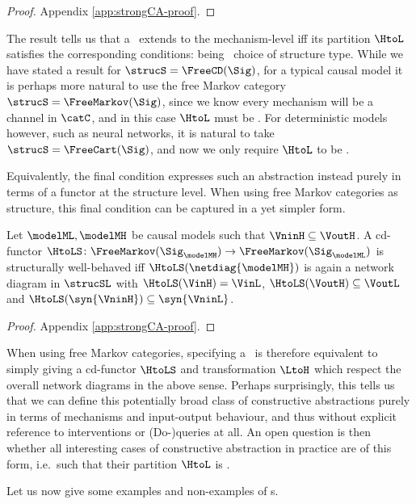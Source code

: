 \documentclass{article}
\begin{document}
\begin{proof}
Appendix \ref{app:strongCA-proof}.
\end{proof}

The result tells us that a \CCA~extends to the mechanism-level iff its partition $\HtoL$ satisfies the corresponding conditions: being \ choice of structure type. While we have stated a result for $\strucS = \FreeCD(\Sig)$, for a typical causal model it is perhaps more natural to use the free Markov category $\strucS = \FreeMarkov(\Sig)$, since we know every mechanism will be a channel in $\catC$, and in this case $\HtoL$ must be \extrastrong. For deterministic models however, such as neural networks, it is natural to take $\strucS = \FreeCart(\Sig)$, and now we only require $\HtoL$ to be \strong. 

Equivalently, the final condition expresses such an abstraction instead purely in terms of a functor at the structure level. When using free Markov categories as structure, this final condition can be captured in a yet simpler form.

\begin{lemma} \label{lem:Markov-equiv}
Let $\modelML, \modelMH$ be causal models such that $\VninH \subseteq \VoutH$. A cd-functor $\HtoLS \colon \FreeMarkov(\Sig_\modelMH) \to \FreeMarkov(\Sig_\modelML)$ is structurally well-behaved iff $\HtoLS(\netdiag{\modelMH})$ is again a network diagram in $\strucSL$ with $\HtoLS(\VinH) = \VinL$, $\HtoLS(\VoutH) \subseteq \VoutL$ and $\HtoLS(\syn{\VninH}) \subseteq \syn{\VninL}$. 
\end{lemma}

\begin{proof}
Appendix \ref{app:strongCA-proof}.
\end{proof}

When using free Markov categories, specifying a \strongCCA\ is therefore equivalent to simply giving a cd-functor $\HtoLS$ and transformation $\LtoH$ which respect the overall network diagrams in the above sense. Perhaps surprisingly, this tells us that we can define this potentially broad class of constructive abstractions purely in terms of mechanisms and input-output behaviour, and thus without explicit reference to interventions or (Do-)queries at all. An open question is then whether all interesting cases of constructive abstraction in practice are of this form, i.e.~such that their partition $\HtoL$ is \strong. 

Let us now give some examples and non-examples of \strongCCA s. 
\end{document}

